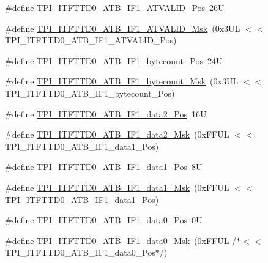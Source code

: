 \begin{DoxyCompactItemize}
\item 
\#define \mbox{\hyperlink{group___c_m_s_i_s___t_p_i_ga0b95f6b474fe2e4b7ba9963b00d18258}{T\+P\+I\+\_\+\+I\+T\+F\+T\+T\+D0\+\_\+\+A\+T\+B\+\_\+\+I\+F1\+\_\+\+A\+T\+V\+A\+L\+I\+D\+\_\+\+Pos}}~26U
\item 
\#define \mbox{\hyperlink{group___c_m_s_i_s___t_p_i_ga8650e68e2efc65b0d94de91772dc5940}{T\+P\+I\+\_\+\+I\+T\+F\+T\+T\+D0\+\_\+\+A\+T\+B\+\_\+\+I\+F1\+\_\+\+A\+T\+V\+A\+L\+I\+D\+\_\+\+Msk}}~(0x3\+U\+L $<$$<$ T\+P\+I\+\_\+\+I\+T\+F\+T\+T\+D0\+\_\+\+A\+T\+B\+\_\+\+I\+F1\+\_\+\+A\+T\+V\+A\+L\+I\+D\+\_\+\+Pos)
\item 
\#define \mbox{\hyperlink{group___c_m_s_i_s___t_p_i_gae82d334486fb5d11e57e8e07fd21be7b}{T\+P\+I\+\_\+\+I\+T\+F\+T\+T\+D0\+\_\+\+A\+T\+B\+\_\+\+I\+F1\+\_\+bytecount\+\_\+\+Pos}}~24U
\item 
\#define \mbox{\hyperlink{group___c_m_s_i_s___t_p_i_ga71301ef5984fef602d83305f34ea5c97}{T\+P\+I\+\_\+\+I\+T\+F\+T\+T\+D0\+\_\+\+A\+T\+B\+\_\+\+I\+F1\+\_\+bytecount\+\_\+\+Msk}}~(0x3\+U\+L $<$$<$ T\+P\+I\+\_\+\+I\+T\+F\+T\+T\+D0\+\_\+\+A\+T\+B\+\_\+\+I\+F1\+\_\+bytecount\+\_\+\+Pos)
\item 
\#define \mbox{\hyperlink{group___c_m_s_i_s___t_p_i_ga79e526cc6f0857f45187e897f4009f55}{T\+P\+I\+\_\+\+I\+T\+F\+T\+T\+D0\+\_\+\+A\+T\+B\+\_\+\+I\+F1\+\_\+data2\+\_\+\+Pos}}~16U
\item 
\#define \mbox{\hyperlink{group___c_m_s_i_s___t_p_i_ga942cc46e6e858b215e81ef6b57c3f63f}{T\+P\+I\+\_\+\+I\+T\+F\+T\+T\+D0\+\_\+\+A\+T\+B\+\_\+\+I\+F1\+\_\+data2\+\_\+\+Msk}}~(0x\+F\+F\+U\+L $<$$<$ T\+P\+I\+\_\+\+I\+T\+F\+T\+T\+D0\+\_\+\+A\+T\+B\+\_\+\+I\+F1\+\_\+data1\+\_\+\+Pos)
\item 
\#define \mbox{\hyperlink{group___c_m_s_i_s___t_p_i_ga7715fac6bd637e7ec153518da1fd4f0b}{T\+P\+I\+\_\+\+I\+T\+F\+T\+T\+D0\+\_\+\+A\+T\+B\+\_\+\+I\+F1\+\_\+data1\+\_\+\+Pos}}~8U
\item 
\#define \mbox{\hyperlink{group___c_m_s_i_s___t_p_i_gada0033c411d5b57161b6e5c244518836}{T\+P\+I\+\_\+\+I\+T\+F\+T\+T\+D0\+\_\+\+A\+T\+B\+\_\+\+I\+F1\+\_\+data1\+\_\+\+Msk}}~(0x\+F\+F\+U\+L $<$$<$ T\+P\+I\+\_\+\+I\+T\+F\+T\+T\+D0\+\_\+\+A\+T\+B\+\_\+\+I\+F1\+\_\+data1\+\_\+\+Pos)
\item 
\#define \mbox{\hyperlink{group___c_m_s_i_s___t_p_i_gae6ff8b9a79602a3546d951261d787cc7}{T\+P\+I\+\_\+\+I\+T\+F\+T\+T\+D0\+\_\+\+A\+T\+B\+\_\+\+I\+F1\+\_\+data0\+\_\+\+Pos}}~0U
\item 
\#define \mbox{\hyperlink{group___c_m_s_i_s___t_p_i_gafb950b90ccb002e81ae6c44482cd46fd}{T\+P\+I\+\_\+\+I\+T\+F\+T\+T\+D0\+\_\+\+A\+T\+B\+\_\+\+I\+F1\+\_\+data0\+\_\+\+Msk}}~(0x\+F\+F\+U\+L /$\ast$$<$$<$ T\+P\+I\+\_\+\+I\+T\+F\+T\+T\+D0\+\_\+\+A\+T\+B\+\_\+\+I\+F1\+\_\+data0\+\_\+\+Pos$\ast$/)

\end{DoxyCompactItemize}
